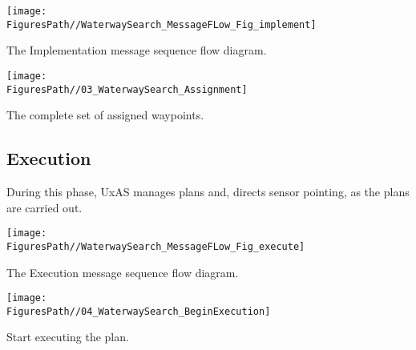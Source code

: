 \begin{marginfigure}[-600pt]
	\texttt{[image: \\FiguresPath//WaterwaySearch\_MessageFLow\_Fig\_implement]}
	\caption{The Implementation message sequence flow diagram.}
	\label{fig:MessageFlow_implement}
\end{marginfigure}

\begin{marginfigure}[-200pt]
	\texttt{[image: \\FiguresPath//03\_WaterwaySearch\_Assignment]}
	\caption{The complete set of assigned waypoints.}
	\label{fig:asignedWaypoints}
\end{marginfigure}


\subsection{Execution}
During this phase, UxAS manages plans and, directs sensor pointing, as the plans are carried out.
\begin{marginfigure}
	\texttt{[image: \\FiguresPath//WaterwaySearch\_MessageFLow\_Fig\_execute]}
	\caption{The Execution message sequence flow diagram.}
	\label{fig:MessageFlow_execute}
\end{marginfigure}

\begin{marginfigure}
	\texttt{[image: \\FiguresPath//04\_WaterwaySearch\_BeginExecution]}
	\caption{Start executing the plan.}
	\label{fig:startExecution}
\end{marginfigure}

